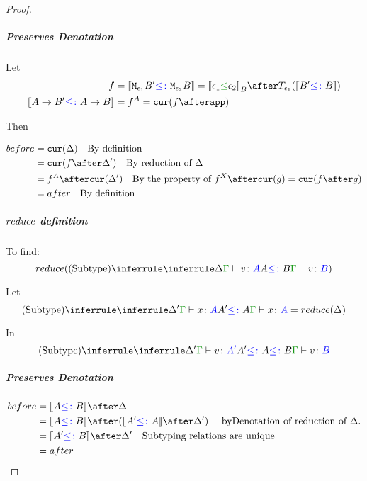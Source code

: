 \documentclass{report}
\begin{document}
\begin{framed}
\begin{proof}
                \subparagraph{Preserves Denotation}
                    Let
                    \begin{align*}
                        f &= \deno{\M{\e_1}{B'}\subtype\M{\e_2}{B}} = \deno{\e_1\subeffect\e_2}_B\after\T{\e_1}{(\deno{B'\subtype B})} \\
                        \deno{\fntype{A}{B'}\subtype\ab} & = f^A = \cur{f\after \app}
                    \end{align*}
        
                    Then
        
                    \begin{align*}
                        before & = \cur{\D} \qt{By definition}\\
                                & = \cur{f\after\D'} \qt{By reduction of $\D$} \\
                                & = f^A\after\cur{\D'}\qt{By the property of $f^X\after\cur{g} = \cur{f\after g}$} \\
                                & = after \qt{By definition}\\
                    \end{align*}
        
                \case{\vsubtype}
                \subparagraph{$reduce$ definition}
                To find:
                \begin{equation}
                    \reduce(\ntreeruleII{\vsubtype}{\treeruleI{\D}{\gtyperelation{v}{A}}}{ A \subtype B}{\gtyperelation{v}{B}})
                \end{equation}
        
                Let 
                \begin{equation}\label{SubtypeDeltaReduction}
                    \ntreeruleII{\vsubtype}{\treeruleI{\D'}{\gtyperelation{x}{A}}}{ A'\subtype A}{\gtyperelation{x}{A}} = \reduce(\D)
                \end{equation}
        
                In 
                \begin{equation}
                    \ntreeruleII{\vsubtype}{
                        \treeruleI{\D'}{\gtyperelation{v}{A'}}
                    }{
                    A' \subtype A \subtype B
                    }{\gtyperelation{v}{B}}
                \end{equation}
        
                \subparagraph{Preserves Denotation}
                    \begin{align*}
                        before & = \deno{A \subtype B} \after \D \\
                        & = \deno{A \subtype B} \after (\deno{A' \subtype A} \after \D') \qt{ byDenotation of reduction of $\D$.}\\
                        & = \deno{A' \subtype B} \after \D'\qt{Subtyping relations are unique} \\
                        & = after \\
                    \end{align*}
            

\end{proof}
\end{framed}
\end{document}
